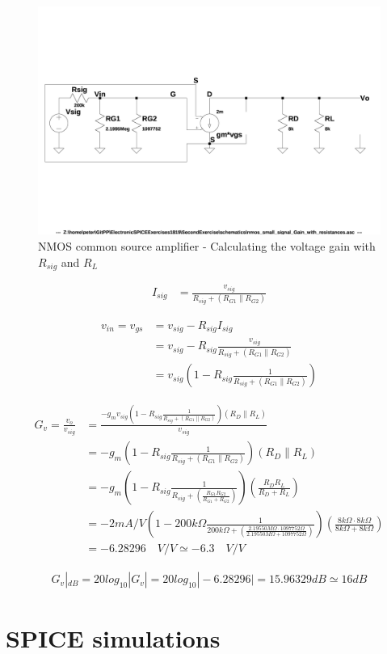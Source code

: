 \documentclass[10pt,a4paper]{book}
\begin{document}
\begin{figure}[h]
  \centering
  \includegraphics[width=12cm]{schematics/nmos_small_signal_with_resistances.jpg}
  \caption{NMOS common source amplifier - Calculating the voltage gain with $R_{sig}$ and $R_L$}
  \label{nmos_pi_gain_with_resistances}
\end{figure}

\begin{align}
I_{sig} &= \frac{v_{sig}}{R_{sig} + (R_{G1} \parallel R_{G2})}
\end{align}

\begin{align}
v_{in} = v_{gs} &= v_{sig} - R_{sig} I_{sig}\\
&= v_{sig} - R_{sig} \frac{v_{sig}}{R_{sig} + (R_{G1} \parallel R_{G2})}\\
&= v_{sig} \left(1 - R_{sig} \frac{1}{R_{sig} + (R_{G1} \parallel R_{G2})}\right)
\end{align}

\begin{align}
G_v = \frac{v_o}{v_{sig}} &= \frac{-g_m v_{sig} \left(1 - R_{sig} \frac{1}{R_{sig} + (R_{G1} \parallel R_{G2})}\right) (R_D \parallel R_L)}{v_{sig}}\\
&= -g_m \left(1 - R_{sig} \frac{1}{R_{sig} + (R_{G1} \parallel R_{G2})}\right) (R_D \parallel R_L)\\
&= -g_m \left(1 - R_{sig} \frac{1}{R_{sig} + \left(\frac{R_{G1}R_{G2}}{R_{G1}+R_{G2}}\right)}\right) \left(\frac{R_{D}R_{L}}{R_{D}+R_{L}}\right)\\
&= - 2mA/V \left(1 - 200k\Omega \frac{1}{200k\Omega + \left(\frac{2.19550M\Omega \cdot 1097752\Omega}{2.19550M\Omega +1097752\Omega}\right)}\right) \left(\frac{8k\Omega \cdot 8k\Omega}{8k\Omega + 8k\Omega}\right)\\
&= -6.28296 \quad V/V \simeq -6.3 \quad V/V
\end{align}

\begin{align}
G_v|_{dB} = 20 log_{10} |G_v| = 20 log_{10} |-6.28296| = 15.96329 dB \simeq 16 dB
\end{align}

\section{SPICE simulations}
\end{document}

